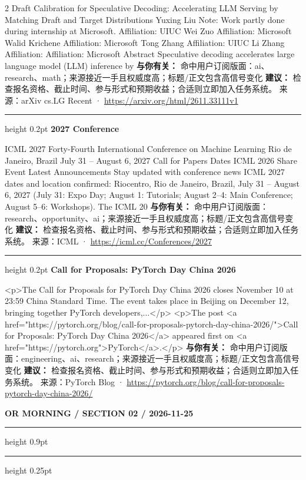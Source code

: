 \documentclass[10.5pt]{ctexart}
\begin{document}
\begin{multicols}{2}
Draft Calibration for Speculative Decoding: Accelerating LLM Serving by Matching Draft and Target Distributions Yuxing Liu Note: Work partly done during internship at Microsoft. Affiliation: UIUC Wei Zuo Affiliation: Microsoft Walid Krichene Affiliation: Microsoft Tong Zhang Affiliation: UIUC Li Zhang Affiliation: Affiliation: Microsoft Abstract Speculative decoding accelerates large language model (LLM) inference by
\textbf{与你有关：} 命中用户订阅版面：ai、research、math；来源接近一手且权威度高；标题/正文包含高信号变化
\textbf{建议：} 检查报名资格、截止时间、参与形式和预期收益；合适则立即加入任务系统。
{\footnotesize\color{ormuted} 来源：arXiv cs.LG Recent · \url{https://arxiv.org/html/2611.33111v1}}
\vspace{2mm}
\hrule height 0.2pt
\vspace{2mm}
{\large\bfseries 2027 Conference}\par
ICML 2027 Forty-Fourth International Conference on Machine Learning Rio de Janeiro, Brazil July 31 – August 6, 2027 Call for Papers Dates ICML 2026 Share Event Latest Announcements Stay updated with conference news ICML 2027 dates and location confirmed: Riocentro, Rio de Janeiro, Brazil, July 31 – August 6, 2027 (July 31: Expo Day; August 1: Tutorials; August 2–4: Main Conference; August 5–6: Workshops). The ICML 20
\textbf{与你有关：} 命中用户订阅版面：research、opportunity、ai；来源接近一手且权威度高；标题/正文包含高信号变化
\textbf{建议：} 检查报名资格、截止时间、参与形式和预期收益；合适则立即加入任务系统。
{\footnotesize\color{ormuted} 来源：ICML · \url{https://icml.cc/Conferences/2027}}
\vspace{2mm}
\hrule height 0.2pt
\vspace{2mm}
{\large\bfseries Call for Proposals: PyTorch Day China 2026}\par
<p>The Call for Proposals for PyTorch Day China 2026 closes November 10 at 23:59 China Standard Time. The event takes place in Beijing on December 12, bringing together PyTorch developers,...</p> <p>The post <a href="https://pytorch.org/blog/call-for-proposals-pytorch-day-china-2026/">Call for Proposals: PyTorch Day China 2026</a> appeared first on <a href="https://pytorch.org">PyTorch</a>.</p>
\textbf{与你有关：} 命中用户订阅版面：engineering、ai、research；来源接近一手且权威度高；标题/正文包含高信号变化
\textbf{建议：} 检查报名资格、截止时间、参与形式和预期收益；合适则立即加入任务系统。
{\footnotesize\color{ormuted} 来源：PyTorch Blog · \url{https://pytorch.org/blog/call-for-proposals-pytorch-day-china-2026/}}
\end{multicols}
\newpage
{\small\bfseries OR MORNING / SECTION 02 / 2026-11-25}
\vspace{2mm}
\hrule height 0.9pt
\vspace{1.5mm}
\hrule height 0.25pt
\vspace{4mm}
\end{document}
